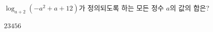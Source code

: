 $\log_{a+2}(-a^2+a+12)$가 정의되도록 하는 모든 정수 $a$의 값의 합은?
\begin{choices32}{$2$}{$3$}{$4$}{$5$}{$6$}\end{choices32}
